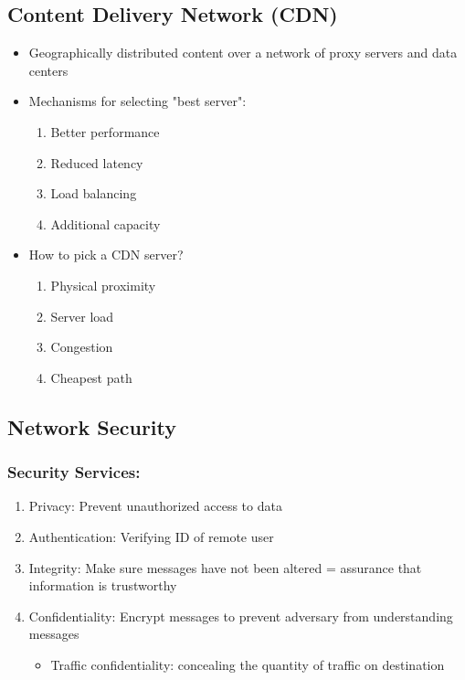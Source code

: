 \documentclass[11pt]{article}
\begin{document}
\subsection{Content Delivery Network (CDN)}
\label{sec:orgheadline154}
\begin{itemize}
\item Geographically distributed content over a network of proxy servers
and data centers
\item Mechanisms for selecting "best server":
\begin{enumerate}
\item Better performance
\item Reduced latency
\item Load balancing
\item Additional capacity
\end{enumerate}

\item How to pick a CDN server?
\begin{enumerate}
\item Physical proximity
\item Server load
\item Congestion
\item Cheapest path
\end{enumerate}
\end{itemize}

\subsection{Network Security}
\label{sec:orgheadline161}
\subsubsection{Security Services:}
\label{sec:orgheadline155}
\begin{enumerate}
\item Privacy: Prevent unauthorized access to data
\item Authentication: Verifying ID of remote user
\item Integrity: Make sure messages have not been altered = assurance
that information is trustworthy
\item Confidentiality: Encrypt messages to prevent adversary from
understanding messages
\begin{itemize}
\item Traffic confidentiality: concealing the quantity of traffic on
destination
\end{itemize}
\end{enumerate}
\end{document}

